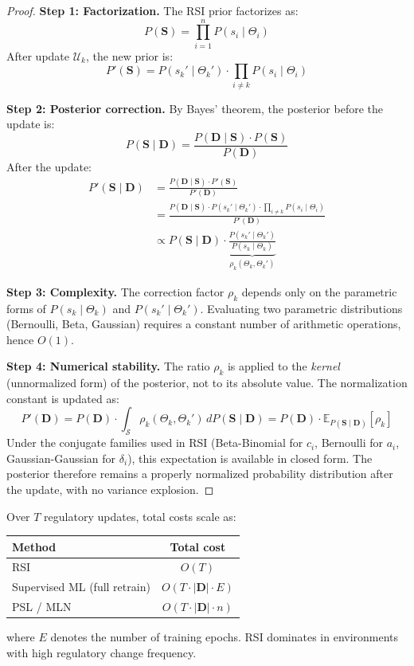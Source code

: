 \begin{proof}
\textbf{Step 1: Factorization.}
The RSI prior factorizes as:
\[
  P(\mathbf{S}) = \prod_{i=1}^n P(s_i \mid \Theta_i)
\]
After update $\mathcal{U}_k$, the new prior is:
\[
  P'(\mathbf{S}) = P(s_k' \mid \Theta_k') \cdot \prod_{i \neq k} P(s_i \mid \Theta_i)
\]

\textbf{Step 2: Posterior correction.}
By Bayes' theorem, the posterior before the update is:
\[
  P(\mathbf{S} \mid \mathbf{D}) = \frac{P(\mathbf{D} \mid \mathbf{S}) \cdot P(\mathbf{S})}{P(\mathbf{D})}
\]
After the update:
\begin{align*}
  P'(\mathbf{S} \mid \mathbf{D})
  &= \frac{P(\mathbf{D} \mid \mathbf{S}) \cdot P'(\mathbf{S})}{P'(\mathbf{D})} \\
  &= \frac{P(\mathbf{D} \mid \mathbf{S}) \cdot P(s_k' \mid \Theta_k')
     \cdot \prod_{i \neq k} P(s_i \mid \Theta_i)}{P'(\mathbf{D})} \\
  &\propto P(\mathbf{S} \mid \mathbf{D}) \cdot
    \underbrace{\frac{P(s_k' \mid \Theta_k')}{P(s_k \mid \Theta_k)}}_{\rho_k(\Theta_k, \Theta_k')}
\end{align*}

\textbf{Step 3: Complexity.}
The correction factor $\rho_k$ depends only on the parametric forms of
$P(s_k \mid \Theta_k)$ and $P(s_k' \mid \Theta_k')$. Evaluating two
parametric distributions (Bernoulli, Beta, Gaussian) requires a constant
number of arithmetic operations, hence $O(1)$.

\textbf{Step 4: Numerical stability.}
The ratio $\rho_k$ is applied to the \emph{kernel} (unnormalized form)
of the posterior, not to its absolute value. The normalization constant
is updated as:
\[
  P'(\mathbf{D}) = P(\mathbf{D}) \cdot \int_{\mathcal{S}} \rho_k(\Theta_k, \Theta_k')
  \, dP(\mathbf{S} \mid \mathbf{D})
  = P(\mathbf{D}) \cdot \mathbb{E}_{P(\mathbf{S} \mid \mathbf{D})}[\rho_k]
\]
Under the conjugate families used in RSI (Beta-Binomial for $c_i$,
Bernoulli for $a_i$, Gaussian-Gaussian for $\delta_i$), this expectation
is available in closed form. The posterior therefore remains a properly
normalized probability distribution after the update, with no variance
explosion.
\end{proof}

\begin{corollary}
\label{cor:cumulative}
Over $T$ regulatory updates, total costs scale as:
\begin{center}
\begin{tabular}{lc}
\toprule
\textbf{Method} & \textbf{Total cost} \\
\midrule
RSI & $O(T)$ \\
Supervised ML (full retrain) & $O(T \cdot |\mathbf{D}| \cdot E)$ \\
PSL / MLN & $O(T \cdot |\mathbf{D}| \cdot n)$ \\
\bottomrule
\end{tabular}
\end{center}
where $E$ denotes the number of training epochs. RSI dominates in
environments with high regulatory change frequency.
\end{corollary}

